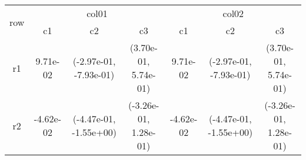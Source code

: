 \begin{tabular}{ccccccc}
\toprule
\multirow{2}{*}{row}&\multicolumn{3}{c}{col01}&\multicolumn{3}{c}{col02}\tabularnewline
\cmidrule(lr){2-4}
\cmidrule(lr){5-7}
&c1&c2&c3&c1&c2&c3\tabularnewline
\midrule
r1&9.71e-02& (-2.97e-01, -7.93e-01)& (3.70e-01, 5.74e-01)&9.71e-02& (-2.97e-01, -7.93e-01)& (3.70e-01, 5.74e-01)\tabularnewline
r2&-4.62e-02& (-4.47e-01, -1.55e+00)& (-3.26e-01, 1.28e-01)&-4.62e-02& (-4.47e-01, -1.55e+00)& (-3.26e-01, 1.28e-01)\tabularnewline
\bottomrule
\end{tabular}
